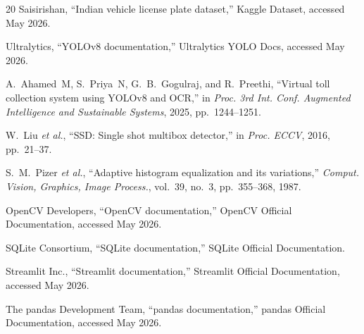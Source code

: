 \documentclass[conference]{IEEEtran}
\begin{document}
\begin{thebibliography}{20}
Saisirishan, ``Indian vehicle license plate dataset,''
Kaggle Dataset, accessed May 2026.

Ultralytics,
``YOLOv8 documentation,''
Ultralytics YOLO Docs, accessed May 2026.

A.~Ahamed~M, S.~Priya~N, G.~B.~Gogulraj, and R.~Preethi,
``Virtual toll collection system using YOLOv8 and OCR,''
in \textit{Proc. 3rd Int. Conf. Augmented Intelligence and
Sustainable Systems}, 2025, pp.~1244--1251.

W.~Liu \textit{et al.},
``SSD: Single shot multibox detector,''
in \textit{Proc. ECCV}, 2016, pp.~21--37.

S.~M.~Pizer \textit{et al.},
``Adaptive histogram equalization and its variations,''
\textit{Comput. Vision, Graphics, Image Process.},
vol.~39, no.~3, pp.~355--368, 1987.

OpenCV Developers,
``OpenCV documentation,''
OpenCV Official Documentation, accessed May 2026.

SQLite Consortium,
``SQLite documentation,''
SQLite Official Documentation.

Streamlit Inc.,
``Streamlit documentation,''
Streamlit Official Documentation, accessed May 2026.

The pandas Development Team,
``pandas documentation,''
pandas Official Documentation, accessed May 2026.

\end{thebibliography}
\end{document}
